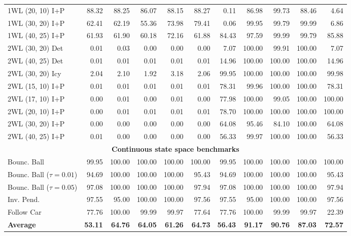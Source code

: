 {\begin{tabular}{|l|rrrrr|rrrrr|}
1WL (20, 10) I+P & 88.32 & 88.25 & 86.07 & 88.15 & 88.27 & 0.11 & 86.98 & 99.73 & 88.46 & 4.64 \\
1WL (30, 20) I+P & 62.41 & 62.19 & 55.36 & 73.98 & 79.41 & 0.06 & 99.95 & 99.79 & 99.99 & 6.86 \\
1WL (40, 25) I+P & 61.93 & 61.90 & 60.18 & 72.16 & 61.88 & 84.43 & 97.59 & 99.99 & 99.79 & 85.88 \\
\hline
2WL (30, 20) Det & 0.01 & 0.03 & 0.00 & 0.00 & 0.00 & 7.07 & 100.00 & 99.91 & 100.00 & 7.07 \\
2WL (40, 25) Det & 0.01 & 0.01 & 0.01 & 0.01 & 0.01 & 14.96 & 100.00 & 100.00 & 100.00 & 14.96 \\
\hline
2WL (30, 20) Icy & 2.04 & 2.10 & 1.92 & 3.18 & 2.06 & 99.95 & 100.00 & 100.00 & 100.00 & 99.98 \\
\hline
2WL (15, 10) I+P & 0.01 & 0.01 & 0.01 & 0.01 & 0.01 & 78.31 & 99.96 & 100.00 & 100.00 & 78.31 \\
2WL (17, 10) I+P & 0.00 & 0.01 & 0.00 & 0.01 & 0.00 & 77.98 & 100.00 & 99.05 & 100.00 & 100.00 \\
2WL (20, 10) I+P & 0.00 & 0.01 & 0.01 & 0.01 & 0.01 & 78.70 & 100.00 & 100.00 & 100.00 & 100.00 \\
2WL (30, 20) I+P & 0.00 & 0.00 & 0.00 & 0.00 & 0.00 & 64.08 & 95.46 & 84.10 & 100.00 & 64.08 \\
2WL (40, 25) I+P & 0.01 & 0.00 & 0.00 & 0.00 & 0.00 & 56.33 & 99.97 & 100.00 & 100.00 & 56.33 \\
\hline
\multicolumn{11}{|c|}{\textbf{Continuous state space benchmarks}}\\\hline
Bounc. Ball & 99.95 & 100.00 & 100.00 & 100.00 & 100.00 & 99.95 & 100.00 & 100.00 & 100.00 & 100.00 \\
Bounc. Ball ($\tau=0.01$) & 94.69 & 100.00 & 100.00 & 100.00 & 95.43 & 94.69 & 100.00 & 100.00 & 100.00 & 95.43 \\
Bounc. Ball ($\tau=0.05$) & 97.08 & 100.00 & 100.00 & 100.00 & 97.94 & 97.08 & 100.00 & 100.00 & 100.00 & 97.94 \\
\hline
Inv. Pend. & 97.55 & 95.00 & 100.00 & 100.00 & 97.56 & 97.55 & 95.00 & 100.00 & 100.00 & 97.56 \\
\hline
Follow Car & 77.76 & 100.00 & 99.99 & 99.97 & 77.64 & 77.76 & 100.00 & 99.99 & 99.97 & 22.39 \\
\hline
\textbf{Average} & \textbf{53.11} & \textbf{64.76} & \textbf{64.05} & \textbf{61.26} & \textbf{64.73} & \textbf{56.43} & \textbf{91.17} & \textbf{90.76} & \textbf{87.03} & \textbf{72.57} \\
\hline
\end{tabular}}
